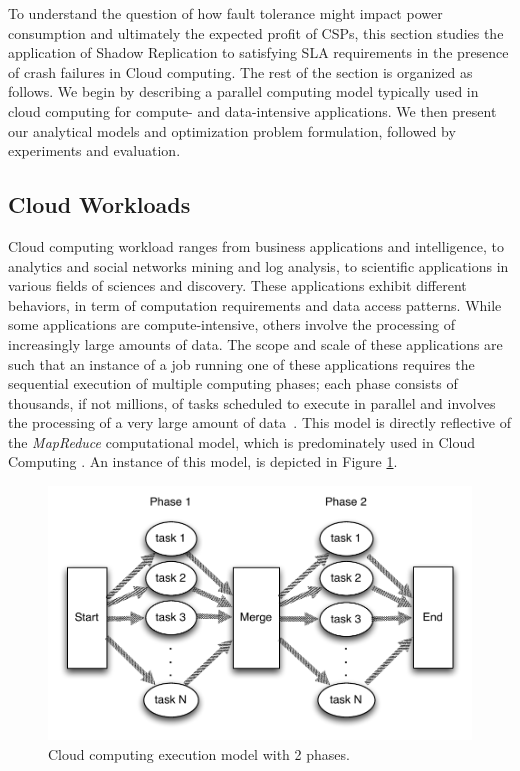 To understand the question of how
fault tolerance might impact power consumption and ultimately the expected profit of CSPs, this section studies the application of Shadow Replication to satisfying SLA requirements in the presence of crash failures in Cloud computing. The rest of the section is organized as follows. We begin by describing a parallel computing model typically used in cloud computing for compute- and data-intensive applications. We then present our analytical models and optimization problem formulation, followed by experiments and evaluation. 


\subsection{Cloud Workloads}
Cloud computing workload ranges from business applications and
intelligence, to analytics and social networks mining and log
analysis, to scientific applications in various fields of sciences and
discovery. These applications exhibit different behaviors, in term of
computation requirements and data access patterns. While some
applications are compute-intensive, others involve the processing of
increasingly large amounts of data. The scope and scale of these
applications are such that an instance of a job running one of these
applications requires the sequential execution of multiple computing
phases; each phase consists of thousands, if not millions, of tasks
scheduled to execute in parallel and involves the processing of a very
large amount of data~\cite{lin2010data,Ferdman:2012:CCS:2150976.2150982}. This
model is directly reflective of the \emph{MapReduce} computational
model, which is predominately used in
Cloud Computing \cite{mrbs}.  An instance of this model, is depicted in Figure \ref{fig:map_reduce}.


\begin{figure}[!h]
	\begin{center}
		\includegraphics[width=\columnwidth]{Figures/map_reduce.pdf}
	\end{center}
	\caption{Cloud computing execution model with 2 phases.}
	\label{fig:map_reduce}
\end{figure}

